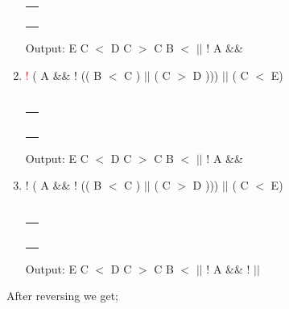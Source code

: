 \documentclass[a4paper]{article}
\begin{document}
\begin{large}
\begin{enumerate}
\begin{tabular}[t]{ | p{1.6em} | }
            \makecell{}       \\ \hline
            \makecell{}       \\ \hline
            \makecell{}       \\ \hline
            \makecell{}       \\ \hline
            \makecell{ $||$ } \\ \hline
          \end{tabular}
          \hspace{2em}
          Output: E C $<$ D C $>$ C B $<$ $||$ ! A \&\&
    \item
          \textcolor{red}{!} ( A \&\& ! (( B $<$ C ) $||$ ( C $>$ D ))) $||$ ( C $<$ E)\\
          \\
          \begin{tabular}[t]{ | p{1.6em} | }
            \makecell{}       \\ \hline
            \makecell{}       \\ \hline
            \makecell{}       \\ \hline
            \makecell{}       \\ \hline
            \makecell{!}      \\ \hline
            \makecell{ $||$ } \\ \hline
          \end{tabular}
          \hspace{2em}
          Output: E C $<$ D C $>$ C B $<$ $||$ ! A \&\&
          \newpage
    \item
          ! ( A \&\& ! (( B $<$ C ) $||$ ( C $>$ D ))) $||$ ( C $<$ E)\\
          \\
          \begin{tabular}[t]{ | p{1.6em} | }
            \makecell{} \\ \hline
            \makecell{} \\ \hline
            \makecell{} \\ \hline
            \makecell{} \\ \hline
            \makecell{} \\ \hline
            \makecell{} \\ \hline
          \end{tabular}
          \hspace{2em}
          Output: E C $<$ D C $>$ C B $<$ $||$ ! A \&\& !  $||$

  \end{enumerate}
  After reversing we get;


\end{large}
\end{document}

